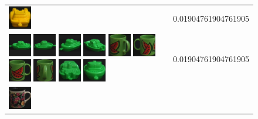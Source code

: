 \begin{figure}[tbp]
\begin{center}
\begin{tabular}{m{11cm} | m{3cm} |}
\includegraphics[width=1cm]{coil/beeld-14.eps}
& {\scriptsize 0.01904761904761905}
\\
\includegraphics[width=1cm]{coil/beeld-54.eps}
\includegraphics[width=1cm]{coil/beeld-55.eps}
\includegraphics[width=1cm]{coil/beeld-57.eps}
\includegraphics[width=1cm]{coil/beeld-58.eps}
\includegraphics[width=1cm]{coil/beeld-34.eps}
\includegraphics[width=1cm]{coil/beeld-31.eps}
\includegraphics[width=1cm]{coil/beeld-30.eps}
\includegraphics[width=1cm]{coil/beeld-35.eps}
\includegraphics[width=1cm]{coil/beeld-59.eps}
\includegraphics[width=1cm]{coil/beeld-56.eps}
& {\scriptsize 0.01904761904761905}
\\
\includegraphics[width=1cm]{coil/beeld-60.eps}

\end{tabular}
\end{center}
\end{figure}
